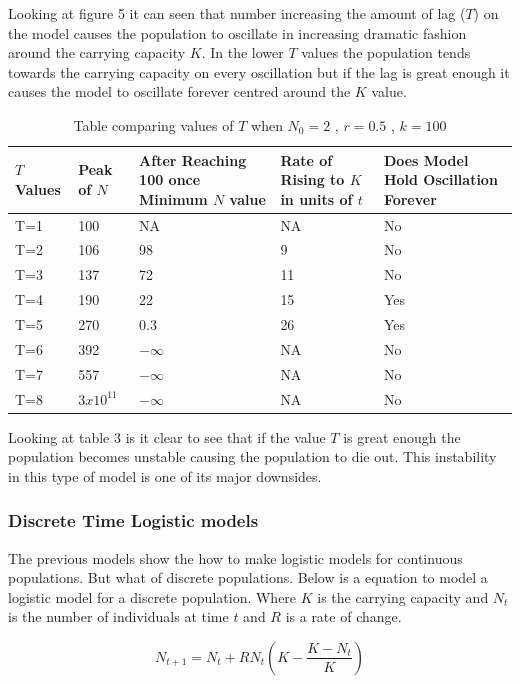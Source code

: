 \documentclass[final]{cmpreport}
\begin{document}
		Looking at figure 5 it can seen that number increasing the amount of lag ($T$) on the model causes the population to oscillate in increasing dramatic fashion around the carrying capacity $K$. In the lower $T$ values the population tends towards the carrying capacity on every oscillation but if the lag is great enough it causes the model to oscillate forever centred around the $K$ value. 
		
		\begin{table}[h!]

		\begin{tabular}[width=\textwidth]{ |p{3cm}||p{3cm}|p{3cm}|p{3cm}|p{3cm}|  }
			\hline
			$T$ Values& Peak of $N$ & After Reaching 100 once Minimum $N$ value& Rate of Rising to $K$ in units of $t$& Does Model Hold Oscillation Forever\\
			\hline
			T=1 &100   	&	NA 	&   NA &	No\\
			T=2 &106 	& 	98  &	9  &	No\\
			T=3 &137 	& 	72	&  	11 &	No\\
			T=4 &190 	& 	22	&  	15 &	Yes\\
			T=5 &270 	& 	0.3	&  	26 &	Yes\\
			T=6 &392 	& 	$-\infty$	&  	NA &	No\\
			T=7 &557 		& 	$-\infty$	&  	NA &	No\\
			T=8 &$3x10^{11}$ 	& 	$-\infty$	&  	NA &	No\\
			\hline
		\end{tabular}
		\caption{Table comparing values of $T$ when $N_0 = 2$ , $r=0.5$ , $k=100$}
		\end{table}
		
		Looking at table 3 is it clear to see that if the value $T$ is great enough the population becomes unstable causing the population to die out. This instability in this type of model is one of its major downsides.
		

	\subsubsection{Discrete Time Logistic models}

	The previous models show the how to make logistic models for continuous populations. But what of discrete populations. Below is a equation to model a logistic model for a discrete population. Where $K$ is the carrying capacity and $N_{t}$ is the number of individuals at time $t$ and $R$ is a rate of change.
	
	\begin{equation}
	 N_{t+1}=N_t+ RN_t(K-\frac{K-N_t}{K}) 
	\end{equation}
	
\end{document}
